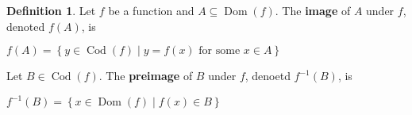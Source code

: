 \documentclass{article}
\theoremstyle{definition}
\newtheorem{definition}{Definition}[section]
\DeclareMathOperator*{\Dom}{Dom}
\DeclareMathOperator*{\Cod}{Cod}
\begin{document}
\begin{definition}
    Let $f$ be a function and $A \subseteq \Dom(f)$.
    The \textbf{image} of $A$ under $f$, denoted $f(A)$,
    is
    \begin{center}
        $f(A) = \left\{ y \in \Cod(f) \mid y = f(x) 
        \text{ for some } x \in A \right\}$
    \end{center}
    Let $B \in \Cod(f)$. The \textbf{preimage} of $B$ under
    $f$, denoetd $f^{-1}(B)$, is 
    \begin{center}
        $f^{-1}(B) = \left\{ x \in \Dom(f) \mid 
        f(x) \in B \right\}$
    \end{center}
\end{definition}
\end{document}
